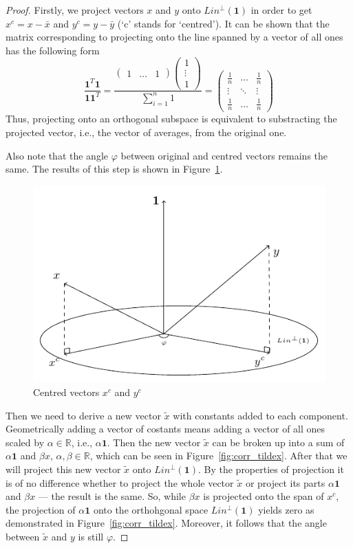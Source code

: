 \documentclass[nobib]{tufte-handout}
\theoremstyle{definition}
\begin{document}
\begin{proof}
Firstly, we project vectors $x$ and $y$ onto $Lin^{\perp}(\mathbf{1})$ in order to get $x^c = x - \bar x$ and $y^c = y - \bar y$
(`c' stands for `centred'). It can be shown that the matrix corresponding to projecting onto the line spanned by a vector of all ones has the following form
\[
\frac{\mathbf{1}^T \mathbf{1}}{\mathbf{1} \mathbf{1}^T} = \frac{\begin{pmatrix} 1 & \ldots & 1 \end{pmatrix} \begin{pmatrix} 1 \\ \vdots \\ 1 \end{pmatrix}}{\sum_{i=1}^n 1} = \begin{pmatrix} \frac{1}{n} & \ldots & \frac{1}{n} \\ \vdots & \ddots & \vdots \\ \frac{1}{n} & \ldots & \frac{1}{n} \end{pmatrix}
\]
Thus, projecting onto an orthogonal subspace is equivalent to substracting the projected vector, i.e., the vector of averages, from the original one.

Also note that the angle $\varphi$ between original and centred vectors remains the same.
The results of this step is shown in Figure~\ref{fig:corr_xyc}.

\begin{figure}[h!]
  \centering
  \includegraphics[width=0.45\linewidth]{images/corr_const_cent.pdf}
  \caption{Centred vectors $x^c$ and $y^c$}
  \label{fig:corr_xyc}
\end{figure}

Then we need to derive a new vector $\tilde x$ with constants added to each component.
Geometrically adding a vector of costants means adding a vector of all ones
scaled by $\alpha \in \mathbb{R}$, i.e., $\alpha \mathbf{1}$.
Then the new vector $\tilde x$ can be broken up into a sum of $\alpha \mathbf{1}$ and
$\beta x$, $\alpha, \beta \in \mathbb{R}$, which can be seen in Figure~\ref{fig:corr_tildex}.
After that we will project this new vector $\tilde x$ onto $Lin^{\perp}(\mathbf{1})$.
By the properties of projection it is of no difference whether to project
the whole vector $\tilde x$ or project its parts $\alpha \mathbf{1}$
and $\beta x$ — the result is the same.
So, while $\beta x$ is projected onto the span of $x^c$, the projection of $\alpha \mathbf{1}$
onto the orthohgonal space $Lin^{\perp}(\mathbf{1})$ yields zero as demonstrated
in Figure~\ref{fig:corr_tildex}.
Moreover, it follows that the angle between $\tilde x$ and $y$ is still $\varphi$.


\end{proof}
\end{document}
